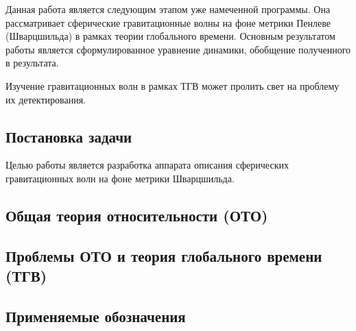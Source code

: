 \documentclass[\docroot/reports/draft/report.tex]{subfiles}
\begin{document}
Данная работа является следующим этапом уже намеченной программы. Она рассматривает сферические гравитационные волны на фоне метрики Пенлеве (Шварцшильда) в рамках теории глобального времени. Основным результатом работы является сформулированное уравнение динамики, обобщение полученного в \cite{Vas2018b} результата.

Изучение гравитационных волн в рамках ТГВ может пролить свет на проблему их детектирования.

\subsection{Постановка задачи}

Целью работы является разработка аппарата описания сферических гравитационных волн на фоне метрики Шварцшильда.

\subsection{Общая теория относительности (ОТО)}


\subsection{Проблемы ОТО и теория глобального времени (ТГВ)}


\subsection{Применяемые обозначения}


\end{document}
